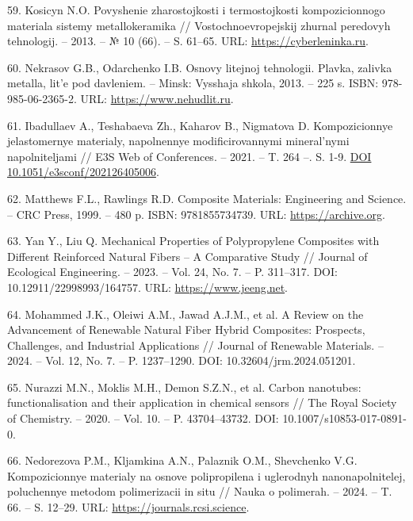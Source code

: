 \begin{references}
59. Kosicyn N.O. Povyshenie zharostojkosti i termostojkosti
kompozicionnogo materiala sistemy metallo\-keramika //
Vostochnoevropejskij zhurnal peredovyh tehnologij. – 2013. – № 10
(66). –
S. 61–65. URL: \href{https://cyberleninka.ru/article/n/povyshenie-zharostoykosti-i-termostoykosti-kompozitsionnogo-materiala-sistemy-metallkeramika}{https://cyberleninka.ru}.

60. Nekrasov G.B., Odarchenko I.B. Osnovy litejnoj tehnologii. Plavka,
zalivka metalla, lit'e pod davleniem. – Minsk: Vysshaja shkola,
2013. – 225 s. ISBN:
978-985-06-2365-2. URL: \href{https://www.nehudlit.ru/books/osnovy-tehnologii-liteynogo-proizvodstva.html}{https://www.nehudlit.ru}.

61. Ibadullaev A., Teshabaeva Zh., Kaharov B., Nigmatova
D. Kompozicionnye jelastomernye materialy, napolnennye
modificirovannymi mineral'nymi napolniteljami // E3S Web of
Conferences. – 2021. – T. 264
–. S. 1-9. \href{https://doi.org/10.1051/e3sconf/202126405006}{DOI 10.1051/e3sconf/202126405006}.

62. Matthews F.L., Rawlings R.D. Composite Materials: Engineering and
Science. – CRC Press, 1999. – 480 p. ISBN:
9781855734739. URL: \href{https://archive.org/details/compositemateria0000matt_k6d9}{https://archive.org}.

63. Yan Y., Liu Q. Mechanical Properties of Polypropylene Composites
with Different Reinforced Natural Fibers – A Comparative Study //
Journal of Ecological Engineering. – 2023. – Vol. 24, No. 7. –
P. 311–317. DOI:
10.12911/22998993/164757. URL: \href{https://www.jeeng.net/Mechanical-Properties-of-Polypropylene-Composites-with-different-Reinforced-Natural\%2C164757\%2C0\%2C2.html}{https://www.jeeng.net}.

64. Mohammed J.K., Oleiwi A.M., Jawad A.J.M., et al. A Review on the
Advancement of Renewable Natural Fiber Hybrid Composites: Prospects,
Challenges, and Industrial Applications // Journal of Renew\-able
Materials. – 2024. – Vol. 12, No. 7. – P. 1237–1290. DOI:
10.32604/jrm.2024.051201.

65. Nurazzi M.N., Moklis M.H., Demon S.Z.N., et al. Carbon nanotubes:
functionalisation and their applic\-ation in chemical sensors // The
Royal Society of Chemistry. – 2020. – Vol. 10. – P. 43704–43732. DOI:
10.1007/s10853-017-0891-0.

66. Nedorezova P.M., Kljamkina A.N., Palaznik O.M., Shevchenko
V.G. Kompozicionnye materialy na osnove polipropilena i uglerodnyh
nanonapolnitelej, poluchennye metodom polimerizacii in situ // Nauka o
polimerah. – 2024. – T. 66. –
S. 12–29. URL: \href{https://journals.rcsi.science/2308-1139/article/view/266169?ysclid=m88hbaqgg240440584}{https://journals.rcsi.science}.


\end{references}
